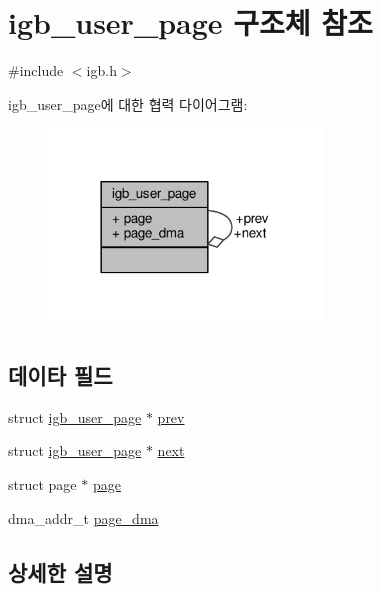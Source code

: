 \hypertarget{structigb__user__page}{}\section{igb\+\_\+user\+\_\+page 구조체 참조}
\label{structigb__user__page}


{\ttfamily \#include $<$igb.\+h$>$}



igb\+\_\+user\+\_\+page에 대한 협력 다이어그램\+:
\nopagebreak
\begin{figure}[H]
\begin{center}
\leavevmode
\includegraphics[width=206pt]{structigb__user__page__coll__graph}
\end{center}
\end{figure}
\subsection*{데이타 필드}
\begin{DoxyCompactItemize}
\item 
struct \hyperlink{structigb__user__page}{igb\+\_\+user\+\_\+page} $\ast$ \hyperlink{structigb__user__page_a996875864cd059c92f5d96a65bea4e8b}{prev}
\item 
struct \hyperlink{structigb__user__page}{igb\+\_\+user\+\_\+page} $\ast$ \hyperlink{structigb__user__page_a5f0fc326c29a26312987e7c21babb4a2}{next}
\item 
struct page $\ast$ \hyperlink{structigb__user__page_ad45c9283ecdd581420d88bc33100364a}{page}
\item 
dma\+\_\+addr\+\_\+t \hyperlink{structigb__user__page_a66dbebc2e3b2bd23d80c63b6aff0c215}{page\+\_\+dma}
\end{DoxyCompactItemize}


\subsection{상세한 설명}


